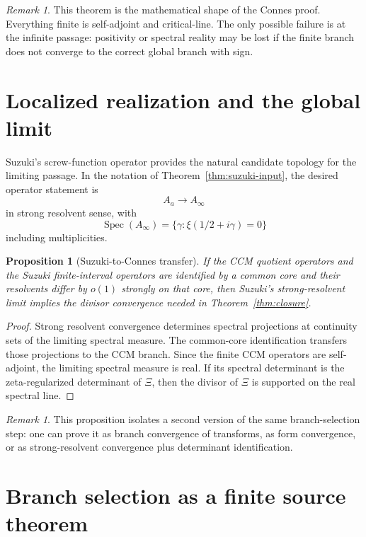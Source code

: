 \documentclass[11pt]{amsart}
\newtheorem{proposition}[theorem]{Proposition}
\theoremstyle{definition}
\theoremstyle{remark}
\newtheorem{remark}[theorem]{Remark}
\newcommand{\XiR}{\Xi}
\DeclareMathOperator{\Spec}{Spec}
\begin{document}
\begin{remark}
This theorem is the mathematical shape of the Connes proof.  Everything
finite is self-adjoint and critical-line.  The only possible failure is at
the infinite passage: positivity or spectral reality may be lost if the
finite branch does not converge to the correct global branch with sign.
\end{remark}

\section{Localized realization and the global limit}

Suzuki's screw-function operator provides the natural candidate topology for
the limiting passage.  In the notation of Theorem~\ref{thm:suzuki-input},
the desired operator statement is
\[
 A_a \longrightarrow A_\infty
\tag{6.1}
\]
in strong resolvent sense, with
\[
 \Spec(A_\infty)=\{\gamma:\xi(1/2+i\gamma)=0\}
\tag{6.2}
\]
including multiplicities.

\begin{proposition}[Suzuki-to-Connes transfer]
If the CCM quotient operators and the Suzuki finite-interval operators are
identified by a common core and their resolvents differ by \(o(1)\) strongly
on that core, then Suzuki's strong-resolvent limit implies the divisor
convergence needed in Theorem~\ref{thm:closure}.
\end{proposition}

\begin{proof}
Strong resolvent convergence determines spectral projections at continuity
sets of the limiting spectral measure.  The common-core identification
transfers those projections to the CCM branch.  Since the finite CCM
operators are self-adjoint, the limiting spectral measure is real.  If its
spectral determinant is the zeta-regularized determinant of \(\XiR\), then
the divisor of \(\XiR\) is supported on the real spectral line.
\end{proof}

\begin{remark}
This proposition isolates a second version of the same branch-selection step:
one
can prove it as branch convergence of transforms, as form convergence, or
as strong-resolvent convergence plus determinant identification.
\end{remark}

\section{Branch selection as a finite source theorem}
\end{document}
